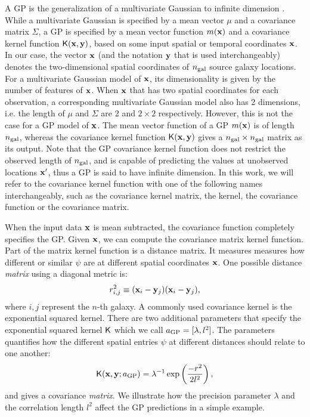 A GP is the generalization of a multivariate Gaussian 
to infinite dimension \citep{Rasmussen2006}. While a multivariate Gaussian is
specified by a mean vector $\mu$ and a covariance matrix $\Sigma$, 
a GP is specified by a mean vector function $m(\mathbf{x})$ and a
covariance kernel function $\mathsf{K}(\mathbf{x}, \mathbf{y})$, based on some input spatial or
temporal coordinates $\mathbf{x}$. In our case, the vector $\mathbf{x}$ (and the
notation $\mathbf{y}$ that is used interchangeably) denotes the
two-dimensional spatial coordinates of $n_{\rm gal}$ source galaxy locations. 
For a multivariate Gaussian model of $\mathbf{x}$, 
its dimensionality is given by the number of features of $\mathbf{x}$.
When $\mathbf{x}$ that has two spatial coordinates for each observation, 
a corresponding multivariate Gaussian model also has 2 dimensions, 
i.e. the length of $\mu$ and $\Sigma$ are 2 and $2 \times 2$ respectively. 
However, this is not the case for a GP model of $\mathbf{x}$. 
The mean vector function of a GP $m(\mathbf{x})$ is of length $n_{\rm gal}$, 
whereas the covariance kernel function $\mathsf{K}(\mathbf{x}, \mathbf{y})$
gives a $n_{\rm gal} \times n_{\rm gal}$ matrix as its output.
Note that the GP covariance kernel function does not restrict the 
observed length of $n_{\rm gal}$, and is capable of predicting the values at
unobserved locations $\mathbf{x}'$, thus a GP is said to have infinite dimension. 
In this work, we will refer to the covariance kernel function with one of 
the following names interchangeably, such as the 
covariance kernel matrix, the kernel, the covariance
function or the covariance matrix. 

When the input data $\mathbf{x}$ is mean subtracted, the covariance function  
completely specifies the GP.
Given  $\mathbf{x}$, we can compute the covariance matrix kernel function. 
Part of the matrix kernel function is a distance matrix. It measures  
measures how different or similar $\psi$ are at different spatial coordinates $\mathbf{x}$. 
One possible distance {\it matrix} using a diagonal metric is: 
\begin{equation}
	r_{i, j}^2 \equiv (\mathbf{x}_i - \mathbf{y}_j) (\mathbf{x}_i - \mathbf{y}_j), 
	\label{eq:distance}
\end{equation}
where $i, j$ represent the $n$-th galaxy.
A commonly used covariance kernel is the exponential squared kernel. There are two
additional parameters that specify the exponential squared kernel $\mathsf{K}$ 
which we call $a_{\rm GP} = [\lambda, l^2]$. The parameters quantifies how the
different spatial entries $\psi$ at different distances should relate to one another: 
\begin{equation}
	\mathsf{K}(\mathbf{x}, \mathbf{y};a_{\rm GP}) = \lambda^{-1} \exp\left(\frac{-r^2}{2 l^2}\right),
	\label{eqn:exp_sq_kernel}
\end{equation}
and gives a covariance {\it matrix}.
We illustrate how the precision parameter $\lambda$ and the correlation
length $l^2$ affect the GP predictions in a simple example. 

